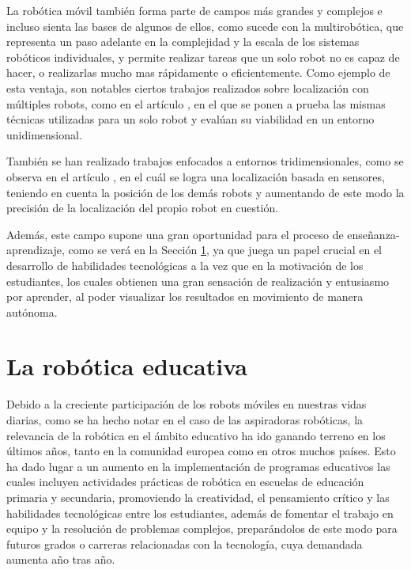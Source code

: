La robótica móvil también forma parte de campos más grandes y complejos e
incluso sienta las bases de algunos de ellos, como sucede con la multirobótica,
que representa un paso adelante en la complejidad y la escala de los sistemas
robóticos individuales, y permite realizar tareas que un solo robot no es capaz
de hacer, o realizarlas mucho mas rápidamente o eficientemente.
Como ejemplo de esta ventaja, son notables ciertos trabajos realizados sobre
localización con múltiples robots, como en el artículo \cite{Trawny2009}, en el
que se ponen a prueba las mismas técnicas utilizadas para un solo robot y
evalúan su viabilidad en un entorno unidimensional.

También se han realizado trabajos enfocados a entornos tridimensionales, como se
observa en el artículo \cite{Fox2000}, en el cuál se logra una localización
basada en sensores, teniendo en cuenta la posición de los demás robots y
aumentando de este modo la precisión de la localización del propio robot en
cuestión.

Además, este campo supone una gran oportunidad para el proceso de
enseñanza-aprendizaje, como se verá en la Sección \ref{sec:robotica_educativa},
ya que juega un papel crucial en el desarrollo de habilidades tecnológicas a la
vez que en la motivación de los estudiantes, los cuales obtienen una gran
sensación de realización y entusiasmo por aprender, al poder visualizar los
resultados en movimiento de manera autónoma.



\section{La robótica educativa}
\label{sec:robotica_educativa} %

Debido a la creciente participación de los robots móviles en nuestras vidas
diarias, como se ha hecho notar en el caso de las aspiradoras robóticas, la
relevancia de la robótica en el ámbito educativo ha ido ganando terreno en los
últimos años, tanto en la comunidad europea como en otros muchos países.
Esto ha dado lugar a un aumento en la implementación de programas educativos las
cuales incluyen actividades prácticas de robótica en escuelas de educación
primaria y secundaria, promoviendo la creatividad, el pensamiento crítico y las
habilidades tecnológicas entre los estudiantes, además de fomentar el trabajo en
equipo y la resolución de problemas complejos, preparándolos de este modo para
futuros grados o carreras relacionadas con la tecnología, cuya demandada aumenta
año tras año.

